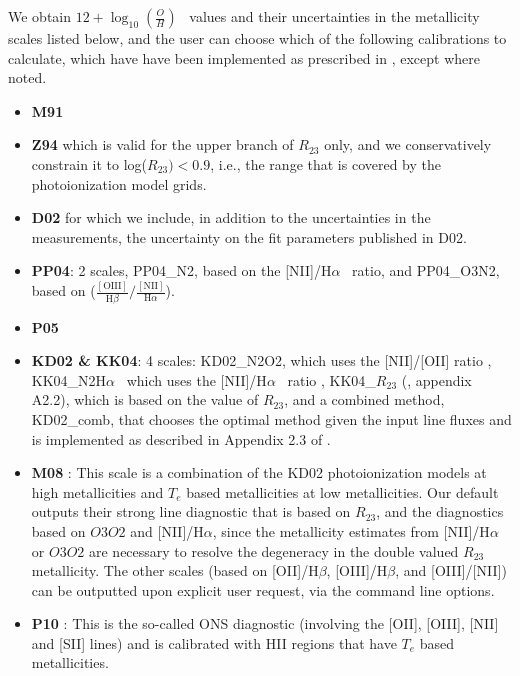 \documentclass{emulateapj}
\newcommand{\oxab}{\ensuremath{12 + \log_{10}(\frac{O}{H})}}
\newcommand{\ha}{H$\alpha$}
\newcommand{\hb}{H$\beta$}
\begin{document}
We obtain \oxab~ values and their uncertainties in the metallicity scales listed below, and the user can choose which of the following calibrations to calculate, which have  have been implemented as prescribed in \citet{kewley08}, except where noted. 
\begin{itemize}
\item {\bf M91} \citep{mcgaugh91}
\item {\bf Z94} \citep{zaritsky94} which is valid for the upper branch of $R_{23}$ only, and we conservatively constrain it to log($R_{23})<0.9$, i.e., the range that is covered by the photoionization model grids.
\item {\bf D02} \citep{denicolo02} for which we include, in addition to the uncertainties in the measurements, the uncertainty on the fit parameters published in D02.
\item {\bf PP04}:  \citep{pettini04} 2 scales,  PP04\_N2, based on the [NII]/\ha~ ratio, and PP04\_O3N2, based on  ($\frac{\mathrm{[OIII]}}{\mathrm{H}\beta}/\frac{\mathrm{[NII]}}{\mathrm{H}\alpha}$).  
\item {\bf P05} \citep{pilyugin05}
\item {\bf KD02 \& KK04}: 4 scales: KD02\_N2O2, which uses the [NII]/[OII] ratio \citep{kewley02}, KK04\_N2\ha~  which uses the [NII]/\ha~ ratio \citep{kobulnicky04}, KK04\_$R_{23}$ (\citealt{kewley08}, appendix A2.2), which is based on the value of $R_{23}$, and a combined method, KD02\_comb, that chooses the optimal method given the input line fluxes and is implemented as described in Appendix 2.3 of \citet{kewley08}. 
\item {\bf M08} \citep{maiolino08}: This scale is a combination of the KD02 photoionization models at high metallicities and $T_e$ based metallicities at low metallicities. Our default outputs their strong line diagnostic that is based on $R_{23}$, and the diagnostics based on $O3O2$ and [NII]/\ha, since the metallicity estimates from  [NII]/\ha~ or $O3O2$ are necessary to resolve the degeneracy in the double valued $R_{23}$ metallicity. The other scales (based on [OII]/\hb, [OIII]/\hb, and [OIII]/[NII]) can be outputted upon explicit user request, via the command line options. 
\item {\bf P10} \citep{pilyugin10}: This is the so-called ONS diagnostic (involving the [OII], [OIII], [NII] and [SII] lines) and is calibrated with HII regions that have $T_e$ based metallicities.

\end{itemize}
\end{document}
